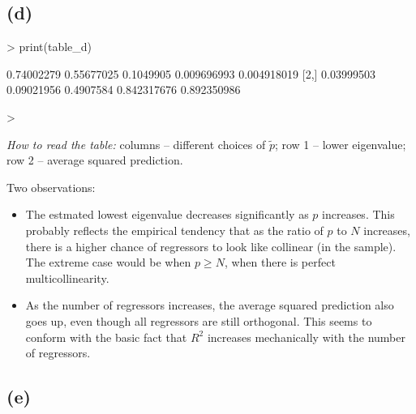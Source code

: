 \documentclass[a4paper,12pt,twoside]{article}
\begin{document}
\subsection*{(d)}


\begin{Schunk}
\begin{Sinput}
> print(table_d)
\end{Sinput}
\begin{Soutput}
           [,1]       [,2]      [,3]        [,4]        [,5]
[1,] 0.74002279 0.55677025 0.1049905 0.009696993 0.004918019
[2,] 0.03999503 0.09021956 0.4907584 0.842317676 0.892350986
\end{Soutput}
\begin{Sinput}
> 
\end{Sinput}
\end{Schunk}

\textit{How to read the table:} columns -- different choices of $\tilde p$;
row 1 -- lower eigenvalue; row 2 -- average squared prediction.


Two observations:

\begin{itemize}
  \item The estmated lowest eigenvalue decreases significantly as $p$ increases. 
  This probably reflects the empirical tendency that as the ratio of $p$ to $N$
  increases, there is a higher chance of regressors to look like collinear
  (in the sample). The extreme case would be when $p \geq N$, when there is perfect multicollinearity.
  \item As the number of regressors increases, the average squared prediction also goes up,
  even though all regressors are still orthogonal. This seems to conform with
  the basic fact that $R^2$ increases mechanically with the number of regressors.
\end{itemize}

\subsection*{(e)}
\end{document}
